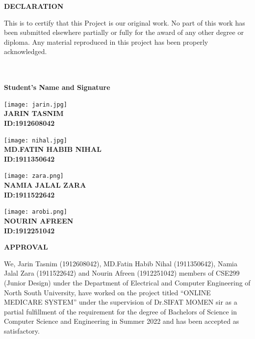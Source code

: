 \documentclass[14pt,a4paper,calibribody]{article}
\begin{document}
\clearpage
\begin{center}
\large{\textbf{DECLARATION}}
\end{center}
This is to certify that this Project is our original work. No part of this work has been submitted elsewhere partially or fully for the award of any other degree or diploma. Any material reproduced in this project has been properly acknowledged.\\\\\\
\begin{center}
\large{\textbf{Student's Name and Signature}}
\end{center}
\begin{center}
\texttt{[image: jarin.jpg]}\\
\textbf{JARIN TASNIM\\ID:1912608042}
\end{center}
\begin{center}
\texttt{[image: nihal.jpg]}\\
\textbf{MD.FATIN HABIB NIHAL\\ID:1911350642}\\
\end{center}
\begin{center}
\texttt{[image: zara.png]}\\
\textbf{NAMIA JALAL ZARA\\ID:1911522642}
\end{center}
\begin{center}
\texttt{[image: arobi.png]}\\
\textbf{NOURIN AFREEN\\ID:1912251042}
\end{center}
\clearpage
\begin{center}
\large{\textbf{APPROVAL}}
\end{center}
We, Jarin Tasnim (1912608042), MD.Fatin Habib Nihal (1911350642), Namia Jalal Zara (1911522642) and Nourin Afreen (1912251042) members of CSE299 (Junior Design) under the Department of Electrical and Computer Engineering of North South University, have worked on the project titled “ONLINE MEDICARE SYSTEM” under the supervision of Dr.SIFAT MOMEN sir as a partial fulfillment of the requirement for the degree of Bachelors of Science in Computer Science and Engineering in Summer 2022 and has been accepted as satisfactory.\\\\\\\\\\\\\\\
\end{document}
